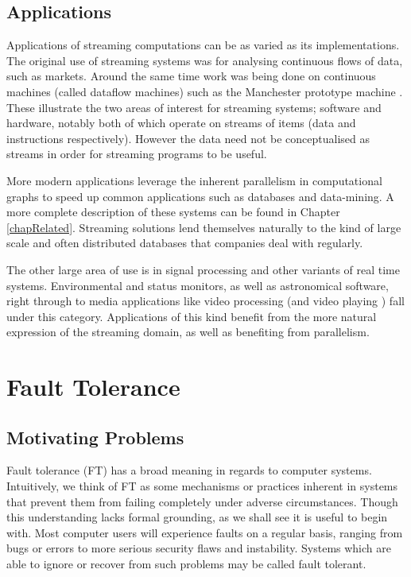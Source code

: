 \subsection{Applications}

Applications of streaming computations can be as varied as its implementations.
The original use of streaming systems was for analysing continuous flows of data, such as markets.
Around the same time work was being done on continuous machines (called dataflow machines) such as the Manchester prototype machine \cite{gur85}.
These illustrate the two areas of interest for streaming systems; software and hardware, notably both of which operate on streams of items (data and instructions respectively).
However the data need not be conceptualised as streams in order for streaming programs to be useful.

More modern applications leverage the inherent parallelism in computational graphs to speed up common applications such as databases and data-mining.
A more complete description of these systems can be found in Chapter \ref{chapRelated}.
Streaming solutions lend themselves naturally to the kind of large scale and often distributed databases that companies deal with regularly.

The other large area of use is in signal processing and other variants of real time systems.
Environmental and status monitors, as well as astronomical software, right through to media applications like video processing (and video playing \cite{thies02}) fall under this category.
Applications of this kind benefit from the more natural expression of the streaming domain, as well as benefiting from parallelism.

\section{Fault Tolerance}
\subsection{Motivating Problems}
Fault tolerance (FT) has a broad meaning in regards to computer systems.
Intuitively, we think of FT as some mechanisms or practices inherent in systems that prevent them from failing completely under adverse circumstances.
Though this understanding lacks formal grounding, as we shall see it is useful to begin with.
Most computer users will experience faults on a regular basis, ranging from bugs or errors to more serious security flaws and instability.
Systems which are able to ignore or recover from such problems may be called fault tolerant.

